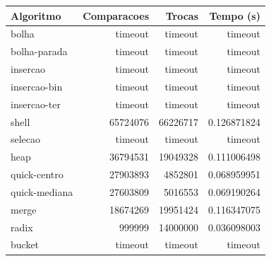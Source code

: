 \begin{tabular}{lrrr}
\hline
Algoritmo & Comparacoes & Trocas & Tempo (s) \\
\hline
bolha & timeout & timeout & timeout \\
bolha-parada & timeout & timeout & timeout \\
insercao & timeout & timeout & timeout \\
insercao-bin & timeout & timeout & timeout \\
insercao-ter & timeout & timeout & timeout \\
shell & 65724076 & 66226717 & 0.126871824 \\
selecao & timeout & timeout & timeout \\
heap & 36794531 & 19049328 & 0.111006498 \\
quick-centro & 27903893 & 4852801 & 0.068959951 \\
quick-mediana & 27603809 & 5016553 & 0.069190264 \\
merge & 18674269 & 19951424 & 0.116347075 \\
radix & 999999 & 14000000 & 0.036098003 \\
bucket & timeout & timeout & timeout \\
\hline
\end{tabular}
